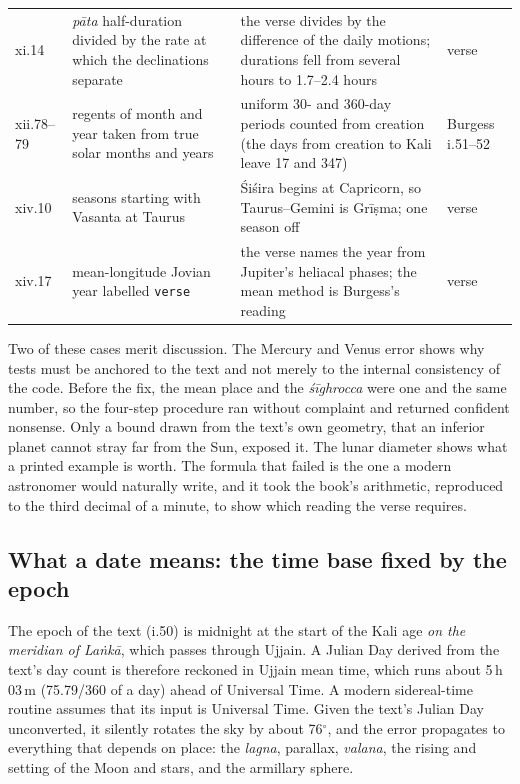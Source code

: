 \documentclass[11pt,a4paper]{article}
\begin{document}
\begin{table}[ht]
\begin{tabularx}{\textwidth}{@{}l L L L@{}}
xi.14 & \textit{p\=ata} half-duration divided by the rate at which the declinations separate & the verse divides by the difference of the daily motions; durations fell from several hours to 1.7--2.4 hours & verse \\
xii.78--79 & regents of month and year taken from true solar months and years & uniform 30- and 360-day periods counted from creation (the days from creation to Kali leave 17 and 347) & Burgess i.51--52 \\
xiv.10 & seasons starting with Vasanta at Taurus & \'Si\'sira begins at Capricorn, so Taurus--Gemini is Gr\=i\d{s}ma; one season off & verse \\
xiv.17 & mean-longitude Jovian year labelled \texttt{verse} & the verse names the year from Jupiter's heliacal phases; the mean method is Burgess's reading & verse \\
\bottomrule
\end{tabularx}
\end{table}

Two of these cases merit discussion. The Mercury and Venus error shows why tests must be anchored to the text and not merely to the internal consistency of the code. Before the fix, the mean place and the \textit{\'s\=ighrocca} were one and the same number, so the four-step procedure ran without complaint and returned confident nonsense. Only a bound drawn from the text's own geometry, that an inferior planet cannot stray far from the Sun, exposed it. The lunar diameter shows what a printed example is worth. The formula that failed is the one a modern astronomer would naturally write, and it took the book's arithmetic, reproduced to the third decimal of a minute, to show which reading the verse requires.

\subsection{What a date means: the time base fixed by the epoch}
\label{sec:timebase}

The epoch of the text (i.50) is midnight at the start of the Kali age \emph{on the meridian of La\.nk\=a}, which passes through Ujjain. A Julian Day derived from the text's day count is therefore reckoned in Ujjain mean time, which runs about 5\,h\,03\,m (75.79/360 of a day) ahead of Universal Time. A modern sidereal-time routine assumes that its input is Universal Time. Given the text's Julian Day unconverted, it silently rotates the sky by about 76$^\circ$, and the error propagates to everything that depends on place: the \textit{lagna}, parallax, \textit{valana}, the rising and setting of the Moon and stars, and the armillary sphere.
\end{document}
